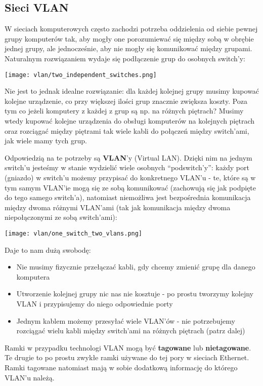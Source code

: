 \documentclass[main.tex]{subfiles}
\begin{document}
    \subsection{Sieci VLAN}
    W sieciach komputerowych często zachodzi potrzeba oddzielenia od siebie pewnej grupy komputerów tak, aby mogły one porozumiewać się między sobą w obrębie jednej grupy,
    ale jednocześnie, aby nie mogły się komunikować między grupami.
    Naturalnym rozwiązaniem wydaje się podłączenie grup do osobnych switch'y:

    \bigskip
    \texttt{[image: vlan/two\_independent\_switches.png]}
    \smallskip

    \noindent Nie jest to jednak idealne rozwiązanie: dla każdej kolejnej grupy musimy kupować kolejne urządzenie, co przy większej ilości grup znacznie zwiększa koszty.
    Poza tym co jeżeli komputery z każdej z grup są np. na różnych piętrach? Musimy wtedy kupować kolejne urządzenia do obsługi komputerów na kolejnych piętrach oraz
    rozciągać między piętrami tak wiele kabli do połączeń między switch'ami, jak wiele mamy tych grup.

    Odpowiedzią na te potrzeby są \textbf{VLAN}'y (Virtual LAN). Dzięki nim na jednym switch'u jesteśmy w stanie wydzielić wiele osobnych ``podswitch'y'':
    każdy port (gniazdo) w switch'u możemy przypisać do konkretnego VLAN'u - te, które są w tym samym VLAN'ie mogą się ze sobą komunikować (zachowują się jak podpięte
    do tego samego switch'a), natomiast niemożliwa jest bezpośrednia komunikacja między dwoma różnymi VLAN'ami (tak jak komunikacja między dwoma niepołączonymi ze sobą switch'ami):

    \bigskip
    \texttt{[image: vlan/one\_switch\_two\_vlans.png]}
    \smallskip

    \noindent Daje to nam dużą swobodę:
    \begin{itemize}
        \item Nie musimy fizycznie przełączać kabli, gdy chcemy zmienić grupę dla danego komputera
        \item Utworzenie kolejnej grupy nic nas nie kosztuje - po prostu tworzymy kolejny VLAN i przypisujemy do niego odpowiednie porty
        \item Jednym kablem możemy przesyłać wiele VLAN'ów - nie potrzebujemy rozciągać wielu kabli między switch'ami na różnych piętrach (patrz dalej)
    \end{itemize}

    Ramki w przypadku technologi VLAN mogą być \textbf{tagowane} lub \textbf{nietagowane}. Te drugie to po prostu zwykłe ramki używane do tej pory w sieciach Ethernet.
    Ramki tagowane natomiast mają w sobie dodatkową informację do którego VLAN'u należą.
\end{document}

